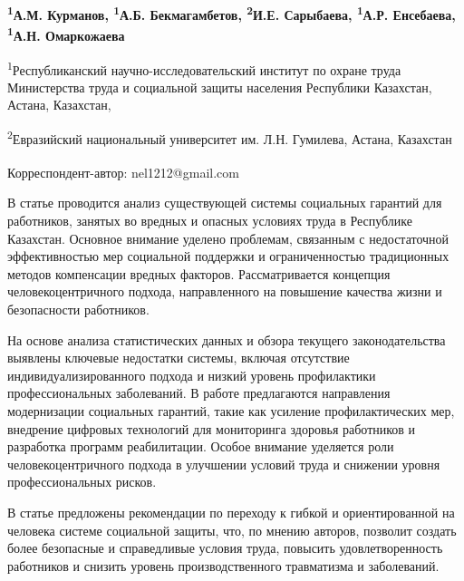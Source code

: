 
\begin{articleheader}

{\bfseries \textsuperscript{1}А.М. Курманов, \textsuperscript{1}А.Б.
Бекмагамбетов, \textsuperscript{2}И.Е. Сарыбаева,
\textsuperscript{1}А.Р. Енсебаева\textsuperscript{\envelope },}
{\bfseries \textsuperscript{1}А.Н. Омаркожаева}
\end{articleheader}
\begin{affiliation}

\textsuperscript{1}Республиканский научно-исследовательский институт по
охране труда Министерства труда и социальной защиты населения Республики Казахстан, Астана,
Казахстан,

\textsuperscript{2}Евразийский национальный университет им. Л.Н. Гумилева, Астана, Казахстан

\raggedright{\bfseries \textsuperscript{\envelope }}Корреспондент-автор: nel1212@gmail.com
\end{affiliation}

В статье проводится анализ существующей системы социальных гарантий для
работников, занятых во вредных и опасных условиях труда в Республике
Казахстан. Основное внимание уделено проблемам, связанным с
недостаточной эффективностью мер социальной поддержки и ограниченностью
традиционных методов компенсации вредных факторов. Рассматривается
концепция человекоцентричного подхода, направленного на повышение
качества жизни и безопасности работников.

На основе анализа статистических данных и обзора текущего
законодательства выявлены ключевые недостатки системы, включая
отсутствие индивидуализированного подхода и низкий уровень профилактики
профессиональных заболеваний. В работе предлагаются направления
модернизации социальных гарантий, такие как усиление профилактических
мер, внедрение цифровых технологий для мониторинга здоровья работников и
разработка программ реабилитации. Особое внимание уделяется роли
человекоцентричного подхода в улучшении условий труда и снижении уровня
профессиональных рисков.

В статье предложены рекомендации по переходу к гибкой и ориентированной
на человека системе социальной защиты, что, по мнению авторов, позволит
создать более безопасные и справедливые условия труда, повысить
удовлетворенность работников и снизить уровень производственного
травматизма и заболеваний.

